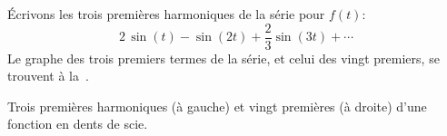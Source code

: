 \begin{example}
Écrivons les trois premières harmoniques de la série pour $f(t)$: 
\begin{equation*}
2 \, \sin (t)
- \sin (2t)
+\frac{2}{3} \sin (3t)
+ \cdots
\end{equation*}
Le graphe des trois premiers termes de la série, et celui des vingt premiers, se trouvent à la~.

\begin{myfig}
\capstart
\caption{Trois premières harmoniques (à gauche) et vingt premières (à droite) d'une fonction en dents de scie.\label{ts:sawtoothfsfig}}
\end{myfig}
\end{example}

